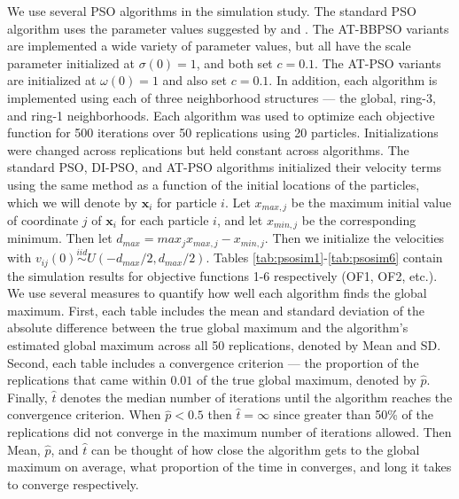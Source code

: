 \documentclass[12pt]{article}
\begin{document}
We use several PSO algorithms in the simulation study. The standard PSO algorithm uses the parameter values suggested by \cite{blum2008swarm} and \cite{clerc2002particle}. The AT-BBPSO variants are implemented a wide variety of parameter values, but all have the scale parameter initialized at $\sigma(0)=1$, and both set $c=0.1$. The AT-PSO variants are initialized at $\omega(0)=1$ and also set $c=0.1$. In addition, each algorithm is implemented using each of three neighborhood structures --- the global, ring-3, and ring-1 neighborhoods. Each algorithm was used to optimize each objective function for 500 iterations over 50 replications using 20 particles. Initializations were changed across replications but held constant across algorithms. The standard PSO, DI-PSO, and AT-PSO algorithms initialized their velocity terms using the same method as a function of the initial locations of the particles, which we will denote by $\bm{x}_i$ for particle $i$. Let $x_{max,j}$ be the maximum initial value of coordinate $j$ of $\bm{x}_i$ for each particle $i$, and let $x_{min,j}$ be the corresponding minimum. Then let $d_{max} = max_{j}x_{max,j} - x_{min,j}$. Then we initialize the velocities with $v_{ij}(0)\stackrel{iid}{\sim}U(-d_{max}/2,d_{max}/2)$. Tables \ref{tab:psosim1}-\ref{tab:psosim6} contain the simulation results for objective functions 1-6 respectively (OF1, OF2, etc.). We use several measures to quantify how well each algorithm finds the global maximum. First, each table includes the mean and standard deviation of the absolute difference between the true global maximum and the algorithm's estimated global maximum across all 50 replications, denoted by Mean and SD. Second, each table includes a convergence criterion --- the proportion of the replications that came within $0.01$ of the true global maximum, denoted by $\widehat{p}$. Finally, $\widehat{t}$ denotes the median number of iterations until the algorithm reaches the convergence criterion. When $\hat{p}<0.5$ then $\hat{t} = \infty$ since greater than 50\% of the replications did not converge in the maximum number of iterations allowed. Then Mean, $\hat{p}$, and $\hat{t}$ can be thought of how close the algorithm gets to the global maximum on average, what proportion of the time in converges, and long it takes to converge respectively.
\end{document}
